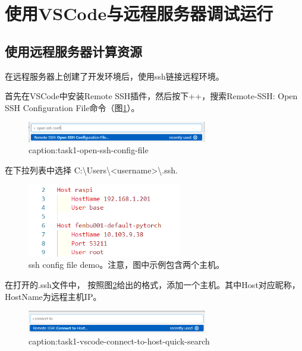 \section{使用VSCode与远程服务器调试运行}

\subsection{使用远程服务器计算资源}\label{subsec:task1-vscode-using-sigs-resources}
在远程服务器上创建了开发环境后，使用ssh链接远程环境。

首先在VSCode中安装Remote SSH插件，然后按下++，搜索Remote-SSH: Open SSH Configuration File命令（图\ref{fig:task1-open-ssh-config-file}）。
\begin{figure}[htbp]
	\centering
	\includegraphics[width=0.7\textwidth]{figures/task1-open-ssh-config-file.png}
	\caption{caption:task1-open-ssh-config-file}
	\label{fig:task1-open-ssh-config-file}
\end{figure}

在下拉列表中选择 C:\textbackslash Users\textbackslash <username>\textbackslash .ssh.

\begin{figure}[htbp]
	\centering
	\includegraphics[width=0.6\textwidth]{figures/task1-ssh-config-file-demo.png}
	\caption{ssh config file demo。注意，图中示例包含两个主机。}
	\label{fig:task1-ssh-config-file-demo}
\end{figure}

在打开的.ssh文件中， 按照图\ref*{fig:task1-ssh-config-file-demo}给出的格式，添加一个主机。其中Host对应昵称，HostName为远程主机IP。

\begin{figure}[htbp]
	\centering
	\includegraphics[width=0.7\textwidth]{figures/task1-vscode-connect-to-host-quick-search.png}
	\caption{caption:task1-vscode-connect-to-host-quick-search}
	\label{fig:task1-vscode-connect-to-host-quick-search}
\end{figure}

